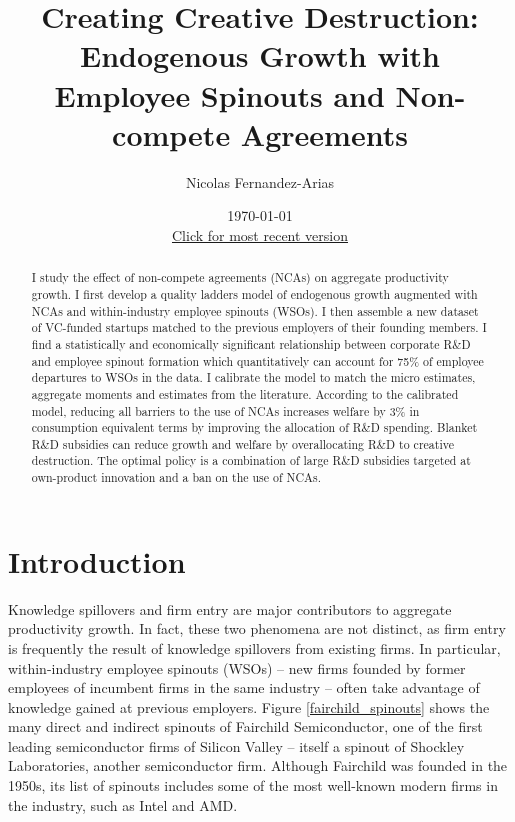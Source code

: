 \documentclass[11pt,english]{article}
\begin{document}
	
\title{Creating Creative Destruction: Endogenous Growth with Employee Spinouts and Non-compete Agreements}

\author{Nicolas Fernandez-Arias} 
\date{\today \\ \small
	\href{https://drive.google.com/file/d/17bZL7-AUJKllRb78r9fIkZscnNdJwo1G/view?usp=sharing}{Click for most recent version}}


\maketitle



\begin{abstract}
	I study the effect of non-compete agreements (NCAs) on aggregate productivity growth. I first develop a quality ladders model of endogenous growth augmented with NCAs and within-industry employee spinouts (WSOs). I then assemble a new dataset of VC-funded startups matched to the previous employers of their founding members. I find a statistically and economically significant relationship between corporate R\&D and employee spinout formation which quantitatively can account for 75\% of employee departures to WSOs in the data. I calibrate the model to match the micro estimates, aggregate moments and estimates from the literature. According to the calibrated model, reducing all barriers to the use of NCAs increases welfare by 3\% in consumption equivalent terms by improving the allocation of R\&D spending. Blanket R\&D subsidies can reduce growth and welfare by overallocating R\&D to creative destruction. The optimal policy is a combination of large R\&D subsidies targeted at own-product innovation and a ban on the use of NCAs.
\end{abstract}

\section{Introduction}

Knowledge spillovers and firm entry are major contributors to aggregate productivity growth. In fact, these two phenomena are not distinct, as firm entry is frequently the result of knowledge spillovers from existing firms. In particular, within-industry employee spinouts (WSOs) -- new firms founded by former employees of incumbent firms in the same industry -- often take advantage of knowledge gained at previous employers. Figure \ref{fairchild_spinouts} shows the many direct and indirect spinouts of Fairchild Semiconductor, one of the first leading semiconductor firms of Silicon Valley -- itself a spinout of Shockley Laboratories, another semiconductor firm. Although Fairchild was founded in the 1950s, its list of spinouts includes some of the most well-known modern firms in the industry, such as Intel and AMD. 
\end{document}
